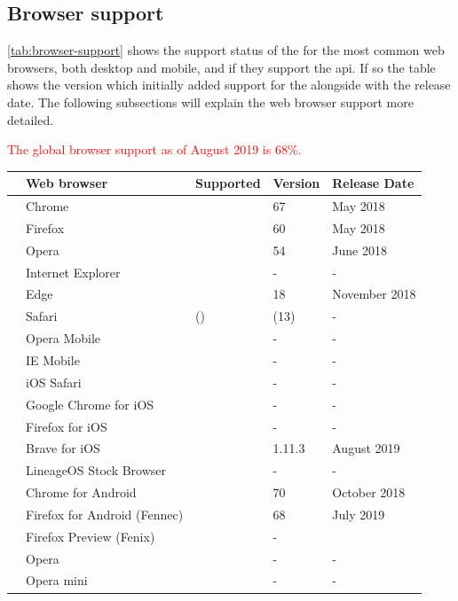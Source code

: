 \subsection{Browser support}

\autoref{tab:browser-support} shows the support status of the \wa{} for the most common web browsers, both desktop and mobile, and if they support the \gls{api}. If so the table shows the version which initially added support for the \wa{} alongside with the release date. The following subsections will explain the web browser support more detailed.

\textcolor{red}{The global browser support as of August 2019 is 68\%.}
\begin{table}[ht]
	\begin{tabularx}{\textwidth}{l|p{5.3cm}|p{2cm}|p{1.9cm}|p{2.8cm}}
		& Web browser & Supported & Version & Release Date \\
		\hline
		\parbox[t]{2mm}{} & Chrome & \OK & 67 & May 2018 \\
		& Firefox & \OK & 60 & May 2018 \\
		& Opera & \OK & 54 & June 2018 \\
		& Internet Explorer & \NOOK & - & - \\
		& Edge & \OK & 18 & November 2018 \\
		& Safari & (\OK) & (13) & - \\
		\hline
		\parbox[t]{2mm}{} & Opera Mobile & \NOOK & - & - \\
		& IE Mobile & \NOOK & - & - \\
		& iOS Safari & \NOOK & - & - \\
		& Google Chrome for iOS & \NOOK & - & - \\
		& Firefox for iOS & \NOOK & - & - \\
		& Brave for iOS & \OK & 1.11.3 & August 2019 \\
		\hline
		\parbox[t]{2mm}{} & LineageOS Stock Browser & \NOOK & - & - \\
		& Chrome for Android & \OK & 70 & October 2018 \\
		& Firefox for Android (Fennec) & \OK & 68 & July 2019 \\
		& Firefox Preview (Fenix) & \NOOK & - \\
		& Opera & \NOOK & - & - \\
		& Opera mini & \NOOK & - & - \\

\end{tabularx}
\end{table}
